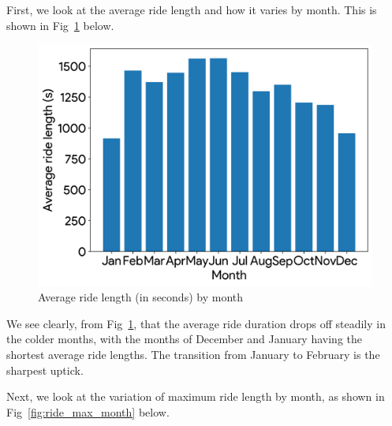\documentclass{article}
\begin{document}
First, we look at the average ride length and how it varies by month. This is shown in Fig~\ref{fig:ride_mean_month} below.


\begin{figure}[h]
  \centering
  \includegraphics[width=\textwidth]{figs/ride_mean_month}
  \caption{Average ride length (in seconds) by month}
  \label{fig:ride_mean_month}
\end{figure}


We see clearly, from Fig~\ref{fig:ride_mean_month}, that the average ride duration drops off steadily in the colder months, with the months of December and January having the shortest average ride lengths. The transition from January to February is the sharpest uptick.

Next, we look at the variation of maximum ride length by month, as shown in Fig~\ref{fig:ride_max_month} below.
\end{document}
